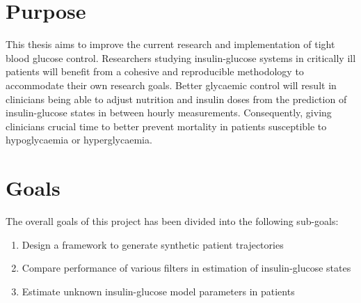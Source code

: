 \documentclass[nomenclature, english, bibtex]{kththesis}
\newcommand*{\generalExpl}[1]{\todo[inline]{#1}}
\newcommand*{\sweExpl}[1]{\todo[inline, backgroundcolor=kth-lightblue40]{#1}}  %
\begin{document}

\section{Purpose}

This thesis aims to improve the current research and implementation of tight blood glucose control. Researchers studying insulin-glucose systems in critically ill patients will benefit from a cohesive and reproducible methodology to accommodate their own research goals. Better glycaemic control will result in clinicians being able to adjust nutrition and insulin doses from the prediction of insulin-glucose states in between hourly measurements. Consequently, giving clinicians crucial time to better prevent mortality in patients susceptible to hypoglycaemia or hyperglycaemia.

\section{Goals} \label{sec:goals}

The overall goals of this project has been divided into the following sub-goals:

\begin{enumerate}
\item Design a framework to generate synthetic patient trajectories
\item Compare performance of various filters in estimation of insulin-glucose states
\item Estimate unknown insulin-glucose model parameters in patients
\end{enumerate}
\end{document}
